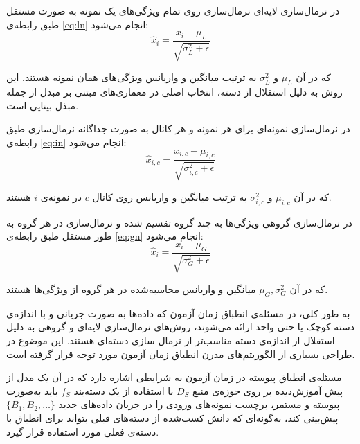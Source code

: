 
در {نرمال‌سازی لایه‌ای}\cite{ln} نرمال‌سازی روی تمام ویژگی‌های یک نمونه به صورت مستقل طبق رابطه‌ی \ref{eq:ln} انجام می‌شود\cite{ln}:
\begin{equation}
	\hat{x}_i = \frac{x_i - \mu_{L}}{\sqrt{\sigma_{L}^2 + \epsilon}}
	\label{eq:ln}
\end{equation}

که در آن \(\mu_{L}\) و \(\sigma_{L}^2\) به ترتیب میانگین و واریانس ویژگی‌های همان نمونه هستند. این روش به دلیل استقلال از دسته، انتخاب اصلی در معماری‌های مبتنی بر مبدل از جمله مبذل بینایی است.  


در {نرمال‌سازی نمونه‌ای}\cite{in} برای هر نمونه و هر کانال به صورت جداگانه نرمال‌سازی طبق رابطه‌ی \ref{eq:in} انجام می‌شود\cite{in}:
\begin{equation}
	\hat{x}_{i,c} = \frac{x_{i,c} - \mu_{i,c}}{\sqrt{\sigma_{i,c}^2 + \epsilon}}
	\label{eq:in}
\end{equation}

که در آن \(\mu_{i,c}\) و \(\sigma_{i,c}^2\) به ترتیب میانگین و واریانس روی کانال \(c\) در نمونه‌ی \(i\) هستند.  


در {نرمال‌سازی گروهی}\cite{gn} ویژگی‌ها به چند گروه تقسیم شده و نرمال‌سازی در هر گروه به طور مستقل طبق رابطه‌ی \ref{eq:gn} انجام می‌شود\cite{gn}:
\begin{equation}
	\hat{x}_i = \frac{x_i - \mu_{G}}{\sqrt{\sigma_{G}^2 + \epsilon}}
	\label{eq:gn}
\end{equation}

که در آن \(\mu_G, \sigma_G^2\) میانگین و واریانس محاسبه‌شده در هر گروه از ویژگی‌ها هستند.  

به طور کلی، در مسئله‌ی انطباق زمان آزمون که داده‌ها به صورت جریانی و با اندازه‌ی دسته کوچک یا حتی واحد ارائه می‌شوند، روش‌های نرمال‌سازی لایه‌ای و گروهی به دلیل استقلال از اندازه‌ی دسته مناسب‌تر از نرمال سازی دسته‌ای هستند. این موضوع در طراحی بسیاری از الگوریتم‌های مدرن انطباق زمان آزمون مورد توجه قرار گرفته است\cite{sar}.


مسئله‌ی {انطباق پیوسته در زمان آزمون} به شرایطی اشاره دارد که در آن یک مدل از پیش آموزش‌دیده بر روی حوزه‌ی منبع \(D_S\) با استفاده از یک دسته‌بند \(f_S\) باید به‌صورت پیوسته و مستمر، برچسب نمونه‌های ورودی را در جریان داده‌های جدید \( \{B_1, B_2, \dots \} \) پیش‌بینی کند، به‌گونه‌ای که دانش کسب‌شده از دسته‌های قبلی بتواند برای انطباق با دسته‌ی فعلی مورد استفاده قرار گیرد. 

